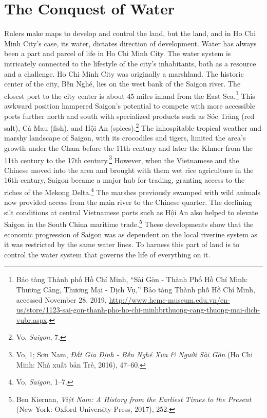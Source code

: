 \section{The Conquest of Water}
Rulers make maps to develop and control the land, but the land, and in Ho Chi Minh City's case, its water, dictates direction of development. Water has always been a part and parcel of life in Ho Chi Minh City. The water system is intricately connected to the lifestyle of the city’s inhabitants, both as a resource and a challenge. Ho Chi Minh City was originally a marshland. The historic center of the city, Bến Nghé, lies on the west bank of the Saigon river. The closest port to the city center is about 45 miles inland from the East Sea.\footnote{Bảo tàng Thành phố Hồ Chí Minh, “Sài Gòn - Thành Phố Hồ Chí Minh: Thương Cảng, Thương Mại - Dịch Vụ,” Bảo tàng Thành phố Hồ Chí Minh, accessed November 28, 2019, \url{http://www.hcmc-museum.edu.vn/en-us/store/1123-sai-gon-thanh-pho-ho-chi-minhbrthuong-cang-thuong-mai-dich-vubr.aspx}.} This awkward position hampered Saigon’s potential to compete with more accessible ports further north and south with specialized products such as Sóc Trăng (red salt), Cà Mau (fish), and Hội An (spices).\footnote{Vo, \textit{Saigon}, 7.} The inhospitable tropical weather and marshy landscape of Saigon, with its crocodiles and tigers, limited the area’s growth under the Cham before the 11th century and later the Khmer from the 11th century to the 17th century.\footnote{Vo, 1; Sơn Nam, \textit{Đất Gia Định - Bến Nghé Xưa \& Người Sài Gòn} (Ho Chi Minh: Nhà xuất bản Trẻ, 2016), 47–60.} However, when the Vietnamese and the Chinese moved into the area and brought with them wet rice agriculture in the 16th century, Saigon became a major hub for trading, granting access to the riches of the Mekong Delta.\footnote{Vo, \textit{Saigon}, 1–7.} The marshes previously swamped with wild animals now provided access from the main river to the Chinese quarter. The declining silt conditions at central Vietnamese ports such as \vi Hội An also helped to elevate Saigon in the South China maritime trade.\footnote{Ben Kiernan, \textit{\vi Việt Nam: A History from the Earliest Times to the Present} (New York: Oxford University Press, 2017), 252.}  These developments show that the economic progression of Saigon was as dependent on the local riverine system as it was restricted by the same water lines. To harness this part of land is to control the water system that governs the life of everything on it.


